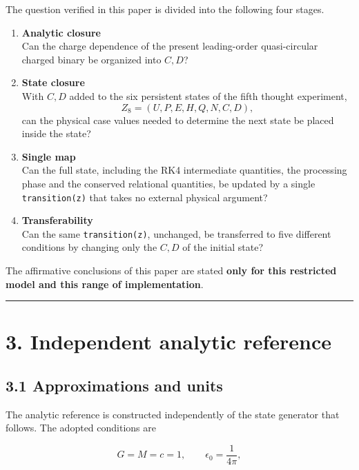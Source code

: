 \documentclass[
  a4paper,
]{article}
\begin{document}
The question verified in this paper is divided into the following four
stages.

\begin{enumerate}
\def\labelenumi{\arabic{enumi}.}
\item
  \textbf{Analytic closure}\\
  Can the charge dependence of the present leading-order quasi-circular
  charged binary be organized into \(C,D\)?
\item
  \textbf{State closure}\\
  With \(C,D\) added to the six persistent states of the fifth thought
  experiment, \[
  Z_8=(U,P,E,H,Q,N,C,D),
  \] can the physical case values needed to determine the next state be
  placed inside the state?
\item
  \textbf{Single map}\\
  Can the full state, including the RK4 intermediate quantities, the
  processing phase and the conserved relational quantities, be updated
  by a single \texttt{transition(z)} that takes no external physical
  argument?
\item
  \textbf{Transferability}\\
  Can the same \texttt{transition(z)}, unchanged, be transferred to five
  different conditions by changing only the \(C,D\) of the initial
  state?
\end{enumerate}

The affirmative conclusions of this paper are stated \textbf{only for
this restricted model and this range of implementation}.

\begin{center}\rule{0.5\linewidth}{0.5pt}\end{center}

\section{3. Independent analytic
reference}\label{independent-analytic-reference}

\subsection{3.1 Approximations and
units}\label{approximations-and-units}

The analytic reference is constructed independently of the state
generator that follows. The adopted conditions are

\[
G=M=c=1,
\qquad
\epsilon_0=\frac{1}{4\pi},
\]
\end{document}
